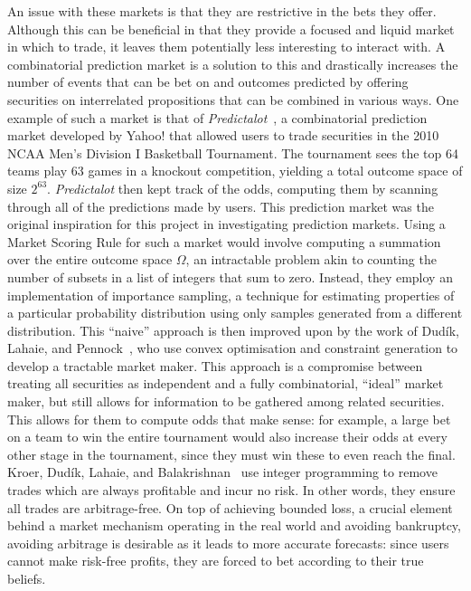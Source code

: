 An issue with these markets is that they are restrictive in the bets they
offer. Although this can be beneficial in that they provide a focused and
liquid market in which to trade, it leaves them potentially less interesting to
interact with. A combinatorial prediction market is a solution to this and
drastically increases the number of events that can be bet on and outcomes
predicted by offering securities on interrelated propositions that can be
combined in various ways. One example of such a market is that of
\emph{Predictalot}~\cite{Predictalot}, a combinatorial prediction market
developed by Yahoo! that allowed users to trade securities in the 2010 NCAA
Men's Division I Basketball Tournament. The tournament sees the top 64 teams
play 63 games in a knockout competition, yielding a total outcome space of size
$2^{63}$. \emph{Predictalot} then kept track of the odds, computing them by
scanning through all of the predictions made by users. This prediction market
was the original inspiration for this project in investigating prediction
markets. Using a Market Scoring Rule for such a market would involve computing
a summation over the entire outcome space $\Omega$, an intractable problem akin
to counting the number of subsets in a list of integers that sum to zero.
Instead, they employ an implementation of importance sampling, a technique for
estimating properties of a particular probability distribution using only
samples generated from a different distribution. This ``naive'' approach is
then improved upon by the work of Dud\'ik, Lahaie, and
Pennock~\cite{Dudik2012}, who use convex optimisation and constraint generation
to develop a tractable market maker. This approach is a compromise between
treating all securities as independent and a fully combinatorial, ``ideal''
market maker, but still allows for information to be gathered among related
securities. This allows for them to compute odds that make sense: for example,
a large bet on a team to win the entire tournament would also increase their
odds at every other stage in the tournament, since they must win these to even
reach the final. Kroer, Dud\'ik, Lahaie, and Balakrishnan~\cite{Kroer2016} use
integer programming to remove trades which are always profitable and incur no
risk. In other words, they ensure all trades are arbitrage-free. On top of
achieving bounded loss, a crucial element behind a market mechanism operating
in the real world and avoiding bankruptcy, avoiding arbitrage is desirable as
it leads to more accurate forecasts: since users cannot make risk-free profits,
they are forced to bet according to their true beliefs.

